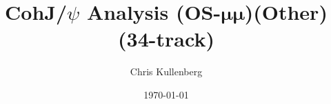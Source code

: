 \title{CohJ/$\psi$ Analysis (\textbf{OS}-$\boldsymbol{\mu\mu}$)(\textbf{Other})(\textbf{34-track})}
\author{Chris Kullenberg}
\date{\today}
